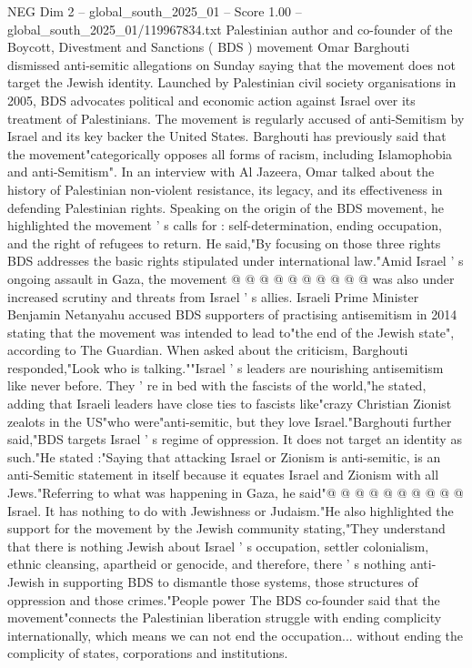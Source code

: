 \begin{textsample}{NEG Dim 2 – global\_south\_2025\_01 – Score 1.00 – global\_south\_2025\_01/119967834.txt}  \label{ex:f2_neg_135}
Palestinian author and co-founder of the Boycott, Divestment and Sanctions ( BDS ) movement Omar Barghouti dismissed anti-semitic allegations on Sunday saying that the movement does not target the Jewish identity.
Launched by Palestinian civil society organisations in 2005, BDS advocates political and economic action against Israel over its treatment of Palestinians.
The movement is regularly accused of anti-Semitism by Israel and its key backer the United States.
Barghouti has previously said that the movement"categorically opposes all forms of racism, including Islamophobia and anti-Semitism".
In an interview with Al Jazeera, Omar talked about the history of Palestinian non-violent resistance, its legacy, and its effectiveness in defending Palestinian rights.
Speaking on the origin of the BDS movement, he highlighted the movement ' s calls for : self-determination, ending occupation, and the right of refugees to return.
He said,"By focusing on those three rights BDS addresses the basic rights stipulated under international law."Amid Israel ' s ongoing assault in Gaza, the movement @ @ @ @ @ @ @ @ @ @ was also under increased scrutiny and threats from Israel ' s allies.
Israeli Prime Minister Benjamin Netanyahu accused BDS supporters of practising antisemitism in 2014 stating that the movement was intended to lead to"the end of the Jewish state", according to The Guardian.
When asked about the criticism, Barghouti responded,"Look who is talking.""Israel ' s leaders are nourishing antisemitism like never before.
They ' re in bed with the fascists of the world,"he stated, adding that Israeli leaders have close ties to fascists like"crazy Christian Zionist zealots in the US"who were"anti-semitic, but they love Israel."Barghouti further said,"BDS targets Israel ' s regime of oppression.
It does not target an identity as such."He stated :"Saying that attacking Israel or Zionism is anti-semitic, is an anti-Semitic statement in itself because it equates Israel and Zionism with all Jews."Referring to what was happening in Gaza, he said"@ @ @ @ @ @ @ @ @ @ Israel.
It has nothing to do with Jewishness or Judaism."He also highlighted the support for the movement by the Jewish community stating,"They understand that there is nothing Jewish about Israel ' s occupation, settler colonialism, ethnic cleansing, apartheid or genocide, and therefore, there ' s nothing anti-Jewish in supporting BDS to dismantle those systems, those structures of oppression and those crimes."People power The BDS co-founder said that the movement"connects the Palestinian liberation struggle with ending complicity internationally, which means we can not end the occupation... without ending the complicity of states, corporations and institutions.

\end{textsample}
